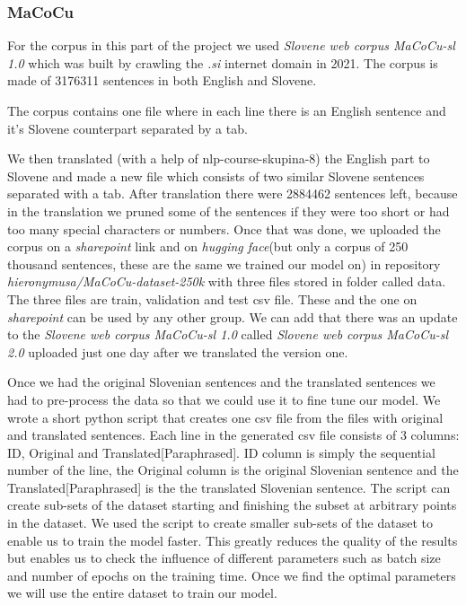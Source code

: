 \documentclass[fleqn,moreauthors,10pt]{ds_report}
\begin{document}
\subsubsection{MaCoCu}
For the corpus in this part of the project we used \emph{Slovene web corpus MaCoCu-sl 1.0
} which was built by crawling the \emph{.si} internet domain in 2021. The corpus is made of 3176311 sentences in both English and Slovene.

The corpus contains one file where in each line there is an English sentence and it's Slovene counterpart separated by a tab.

We then translated (with a help of nlp-course-skupina-8) the English part to Slovene and made a new file which consists of two similar Slovene sentences separated with a tab. After translation there were 2884462 sentences left, because in the translation we pruned some of the sentences if they were too short or had too many special characters or numbers. Once that was done, we uploaded the corpus on a \emph{sharepoint} link and on \emph{hugging face}(but only a corpus of 250 thousand sentences, these are the same we trained our model on) in repository \emph{hieronymusa/MaCoCu-dataset-250k} with three files stored in folder called data. The three files are train, validation and test csv file. These and the one on \emph{sharepoint} can be used by any other group. We can add that there was an update to the \emph{Slovene web corpus MaCoCu-sl 1.0} called \emph{Slovene web corpus MaCoCu-sl 2.0
} uploaded just one day after we translated the version one.

Once we had the original Slovenian sentences and the translated sentences we had to pre-process the data so that we could use it to fine tune our model. We wrote a short python script that creates one csv file from the files with original and translated sentences. Each line in the generated csv file consists of 3 columns: ID, Original and Translated[Paraphrased]. ID column is simply the sequential number of the line, the Original column is the original Slovenian sentence and the Translated[Paraphrased] is the the translated Slovenian sentence. 
The script can create sub-sets of the dataset starting and finishing the subset at arbitrary points in the dataset. We used the script to create smaller sub-sets of the dataset to enable us to train the model faster. 
This greatly reduces the quality of the results but enables us to check the influence of different parameters such as batch size and number of epochs on the training time. Once we find the optimal parameters we will use the entire dataset to train our model. 
\end{document}
